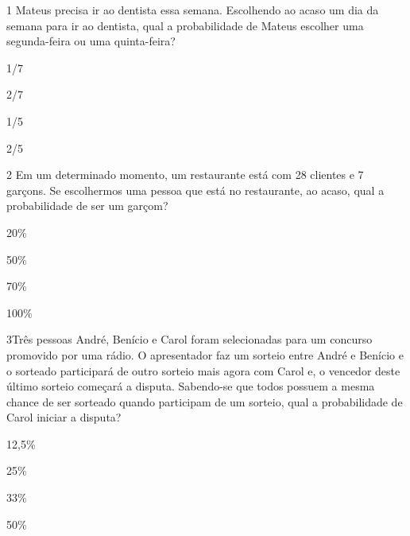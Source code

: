 
\num{1} Mateus precisa ir ao dentista essa semana. Escolhendo ao acaso um
dia da semana para ir ao dentista, qual a probabilidade de Mateus
escolher uma segunda-feira ou uma quinta-feira?

\begin{escolha}
\item
  1/7
\item
  2/7
\item
  1/5
\item
  2/5
\end{escolha}


\num{2} Em um determinado momento, um restaurante está com 28 clientes e 7
garçons. Se escolhermos uma pessoa que está no restaurante, ao acaso,
qual a probabilidade de ser um garçom?

\begin{escolha}
\item
  20\%
\item
  50\%
\item
  70\%
\item
  100\%
\end{escolha}


\num{3}Três pessoas André, Benício e Carol foram selecionadas para um
concurso promovido por uma rádio. O apresentador faz um sorteio entre
André e Benício e o sorteado participará de outro sorteio mais agora com
Carol e, o vencedor deste último sorteio começará a disputa. Sabendo-se
que todos possuem a mesma chance de ser sorteado quando participam de um
sorteio, qual a probabilidade de Carol iniciar a disputa?

\begin{escolha}
\item
  12,5\%
\item
  25\%
\item
  33\%
\item
  50\%
\end{escolha}



